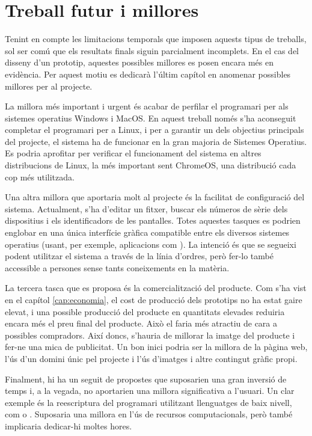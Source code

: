 \chapter{Treball futur i millores}
\label{cap:future_work}

Tenint en compte les limitacions temporals que imposen aquests tipus de
treballs, sol ser comú que els resultats finals siguin parcialment incomplets.
En el cas del disseny d'un prototip, aquestes possibles millores es posen encara
més en evidència. Per aquest motiu es dedicarà l'últim capítol en anomenar
possibles millores per al projecte.

La millora més important i urgent és acabar de perfilar el programari per als
sistemes operatius Windows i MacOS. En aquest treball només s'ha aconseguit
completar el programari per a Linux, i per a garantir un dels objectius principals
del projecte, el sistema ha de funcionar en la gran majoria de Sistemes
Operatius. Es podria aprofitar per verificar el funcionament del sistema en
altres distribucions de Linux, la més important sent ChromeOS, una distribució
cada cop més utilitzada.

Una altra millora que aportaria molt al projecte és la facilitat de
configuració del sistema. Actualment, s'ha d'editar un fitxer, buscar els números
de sèrie dels dispositius i els identificadors de les pantalles. Totes aquestes
tasques es podrien englobar en una única interfície gràfica compatible entre
els diversos sistemes operatius (usant, per exemple, aplicacions com
). La intenció és que se segueixi podent utilitzar el sistema a
través de la línia d'ordres, però fer-lo també accessible a persones sense
tants coneixements en la matèria.

La tercera tasca que es proposa és la comercialització del producte.
Com s'ha vist en el capítol \ref{cap:economia}, el cost de producció dels
prototips no ha estat gaire elevat, i una possible producció del producte en
quantitats elevades reduiria encara més el preu final del producte. Això el
faria més atractiu de cara a possibles compradors. Així doncs, s'hauria de
millorar la imatge del producte i fer-ne una mica de publicitat. Un bon inici
podria ser la millora de la pàgina web, l'ús d'un domini únic pel projecte
i l'ús d'imatges i altre contingut gràfic propi.

Finalment, hi ha un seguit de propostes que suposarien una gran inversió de
temps i, a la vegada, no aportarien una millora significativa a l'usuari. Un clar
exemple és la reescriptura del programari utilitzant llenguatges de baix nivell,
com  o . Suposaria una millora en l'ús de recursos
computacionals, però també implicaria dedicar-hi moltes hores.

